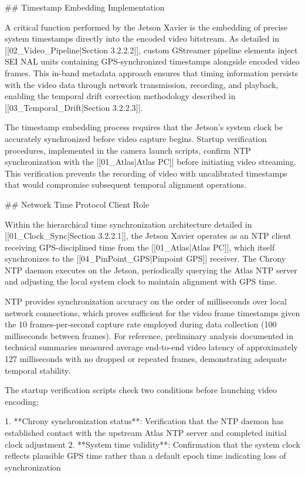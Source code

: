 \documentclass{erauthesis}
\begin{document}
## Timestamp Embedding Implementation

A critical function performed by the Jetson Xavier is the embedding of precise system timestamps directly into the encoded video bitstream. As detailed in [[02_Video_Pipeline|Section 3.2.2.2]], custom GStreamer pipeline elements inject SEI NAL units containing GPS-synchronized timestamps alongside encoded video frames. This in-band metadata approach ensures that timing information persists with the video data through network transmission, recording, and playback, enabling the temporal drift correction methodology described in [[03_Temporal_Drift|Section 3.2.2.3]].

The timestamp embedding process requires that the Jetson's system clock be accurately synchronized before video capture begins. Startup verification procedures, implemented in the camera launch scripts, confirm NTP synchronization with the [[01_Atlas|Atlas PC]] before initiating video streaming. This verification prevents the recording of video with uncalibrated timestamps that would compromise subsequent temporal alignment operations.

## Network Time Protocol Client Role

Within the hierarchical time synchronization architecture detailed in [[01_Clock_Sync|Section 3.2.2.1]], the Jetson Xavier operates as an NTP client receiving GPS-disciplined time from the [[01_Atlas|Atlas PC]], which itself synchronizes to the [[04_PinPoint_GPS|Pinpoint GPS]] receiver. The Chrony NTP daemon executes on the Jetson, periodically querying the Atlas NTP server and adjusting the local system clock to maintain alignment with GPS time.

NTP provides synchronization accuracy on the order of milliseconds over local network connections, which proves sufficient for the video frame timestamps given the 10 frames-per-second capture rate employed during data collection (100 milliseconds between frames). For reference, preliminary analysis documented in technical summaries measured average end-to-end video latency of approximately 127 milliseconds with no dropped or repeated frames, demonstrating adequate temporal stability.

The startup verification scripts check two conditions before launching video encoding:

1. **Chrony synchronization status**: Verification that the NTP daemon has established contact with the upstream Atlas NTP server and completed initial clock adjustment
2. **System time validity**: Confirmation that the system clock reflects plausible GPS time rather than a default epoch time indicating loss of synchronization
\end{document}
